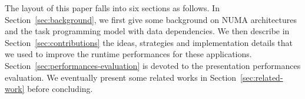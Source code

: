 \documentclass{Styles/llncs}
\newcommand{\TG}[1]{{\color{red}\bfseries TG: #1}}
\begin{document}
The layout of this paper falls into six sections as follows.
In Section~\ref{sec:background}, we first give some background on NUMA architectures
and the task programming model with data dependencies.
We  then describe in Section~\ref{sec:contributions} the ideas, strategies and implementation details that we used to improve the runtime performances
for these applications. Section~\ref{sec:performances-evaluation} is devoted to the presentation performances evaluation.
We eventually present some related works in Section~\ref{sec:related-work}
before concluding.

%

\end{document}
